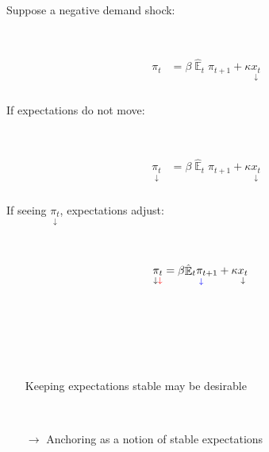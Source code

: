 \documentclass{beamer}
\DeclareMathOperator{\E}{\mathbb{E}}
\begin{document}
\begin{frame}
	\frametitle{}

Suppose a negative demand shock:

\

\begin{align*}
\pi_t & = \beta \hat{\E}_t\pi_{t+1} + \kappa \underset{\downarrow}{x_t} 
\end{align*}




\end{frame}

\begin{frame}
	\frametitle{}

If expectations do not move:

\

\begin{align*}
\underset{\downarrow}{\pi_t} & = \beta \hat{\E}_t\pi_{t+1}+ \kappa \underset{\downarrow}{x_t} 
\end{align*}




\end{frame}

\begin{frame}
	\frametitle{}

If seeing $\underset{\downarrow}{\pi_t}$, expectations adjust:

\

\begin{align*}
\underset{\downarrow \color{red}{\downarrow}}{\pi_t} & = \beta \underset{\color{blue}{\downarrow}}{\hat{\E}_t\pi_{t+1}}+ \kappa \underset{\downarrow}{x_t} 
\end{align*}

\

\

\

\begin{itemize}
\item[] Keeping expectations stable may be desirable

\

\item[$\rightarrow$]  Anchoring as a notion of stable expectations
\end{itemize}

\


\end{frame}
\end{document}
